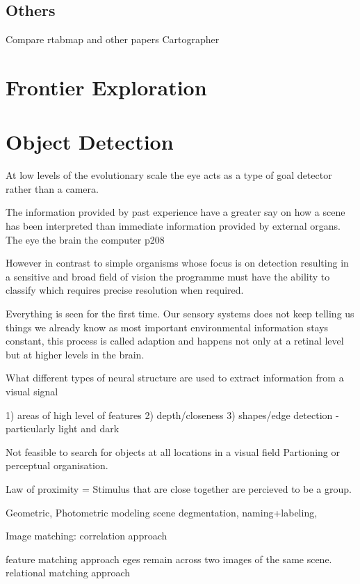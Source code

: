 \documentclass{mproj}
\begin{document}
\subsection{Others}

Compare rtabmap and other papers Cartographer

\section{Frontier Exploration}






\section{Object Detection}

At low levels of the evolutionary scale the eye acts as a type of goal detector rather than a camera. 

The information provided by past experience have a greater say on how a scene has been interpreted than immediate information provided by external organs.
The eye the brain the computer p208

However in contrast to simple organisms whose focus is on detection resulting in a sensitive and broad field of vision the programme must have the ability to classify which requires precise resolution when required.

Everything is seen for the first time.
Our sensory systems does not keep telling us things we already know as most important environmental information stays constant, this process is called adaption and happens not only at a retinal level but at higher levels in the brain.

What different types of neural structure are used to extract information from a visual signal

1) areas of high level of features
2) depth/closeness
3) shapes/edge detection - particularly light and dark

Not feasible to search for objects at all locations in a visual field
Partioning or perceptual organisation.

Law of proximity = Stimulus that are close together are percieved to be a group.

Geometric, Photometric modeling scene degmentation, naming+labeling,

Image matching:
correlation approach
 
feature matching approach
eges remain across two images of the same scene. 
relational matching approach
\end{document}
